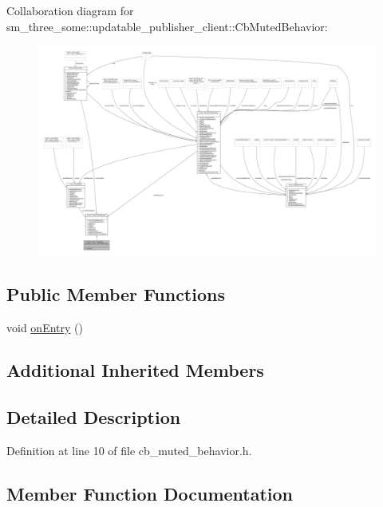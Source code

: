 Collaboration diagram for sm\+\_\+three\+\_\+some\+:\+:updatable\+\_\+publisher\+\_\+client\+:\+:Cb\+Muted\+Behavior\+:
\nopagebreak
\begin{figure}[H]
\begin{center}
\leavevmode
\includegraphics[width=350pt]{classsm__three__some_1_1updatable__publisher__client_1_1CbMutedBehavior__coll__graph}
\end{center}
\end{figure}
\subsection*{Public Member Functions}
\begin{DoxyCompactItemize}
\item 
void \hyperlink{classsm__three__some_1_1updatable__publisher__client_1_1CbMutedBehavior_a62d70cf99958a4b389e217975d43a4e0}{on\+Entry} ()
\end{DoxyCompactItemize}
\subsection*{Additional Inherited Members}


\subsection{Detailed Description}


Definition at line 10 of file cb\+\_\+muted\+\_\+behavior.\+h.



\subsection{Member Function Documentation}
